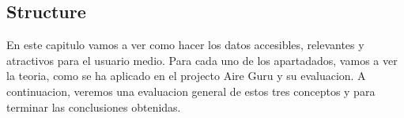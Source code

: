 \subsection*{Structure}
En este capitulo vamos a ver como hacer los datos accesibles, relevantes y atractivos para 
el usuario medio. Para cada uno de los apartadados, vamos a ver la teoria, como se ha aplicado
en el projecto Aire Guru y su evaluacion.
A continuacion, veremos una evaluacion general de estos tres conceptos y para terminar las 
conclusiones obtenidas.